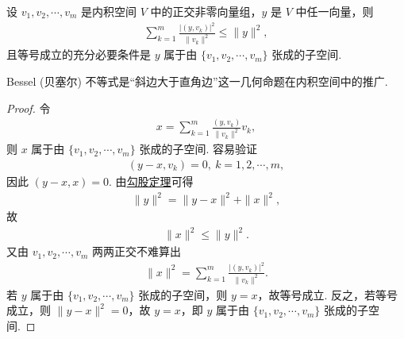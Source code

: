 \documentclass[../../main.tex]{subfiles}
\begin{document}
\begin{proposition}\label{proposition:Bessel不等式}
设 $v_1, v_2, \cdots, v_m$ 是内积空间 $V$ 中的正交非零向量组，$y$ 是 $V$ 中任一向量，则
\begin{align*}
\sum_{k = 1}^{m}\frac{|(y, v_k)|^2}{\|v_k\|^2} \leqslant  \|y\|^2,
\end{align*}
且等号成立的充分必要条件是 $y$ 属于由 $\{v_1, v_2, \cdots, v_m\}$ 张成的子空间.
\end{proposition}
\begin{remark}
Bessel (贝塞尔) 不等式是“斜边大于直角边”这一几何命题在内积空间中的推广.
\end{remark}
\begin{proof}
令
\begin{align*}
x = \sum_{k = 1}^{m}\frac{(y, v_k)}{\|v_k\|^2}v_k,
\end{align*}
则 $x$ 属于由 $\{v_1, v_2, \cdots, v_m\}$ 张成的子空间. 容易验证
\begin{align*}
(y - x, v_k) = 0, \ k = 1, 2, \cdots, m,
\end{align*}
因此 $(y - x, x) = 0$. 由\hyperref[corollary:范数性质的相关推广-勾股定理]{勾股定理}可得
\begin{align*}
\|y\|^2 = \|y - x\|^2 + \|x\|^2,
\end{align*}
故
\begin{align*}
\|x\|^2 \leqslant  \|y\|^2.
\end{align*}
又由 $v_1, v_2, \cdots, v_m$ 两两正交不难算出
\begin{align*}
\|x\|^2 = \sum_{k = 1}^{m}\frac{|(y, v_k)|^2}{\|v_k\|^2}.
\end{align*}
若 $y$ 属于由 $\{v_1, v_2, \cdots, v_m\}$ 张成的子空间，则 $y = x$，故等号成立. 反之，若等号成立，则 $\|y - x\|^2 = 0$，故 $y = x$，即 $y$ 属于由 $\{v_1, v_2, \cdots, v_m\}$ 张成的子空间. 

\end{proof}
\end{document}
